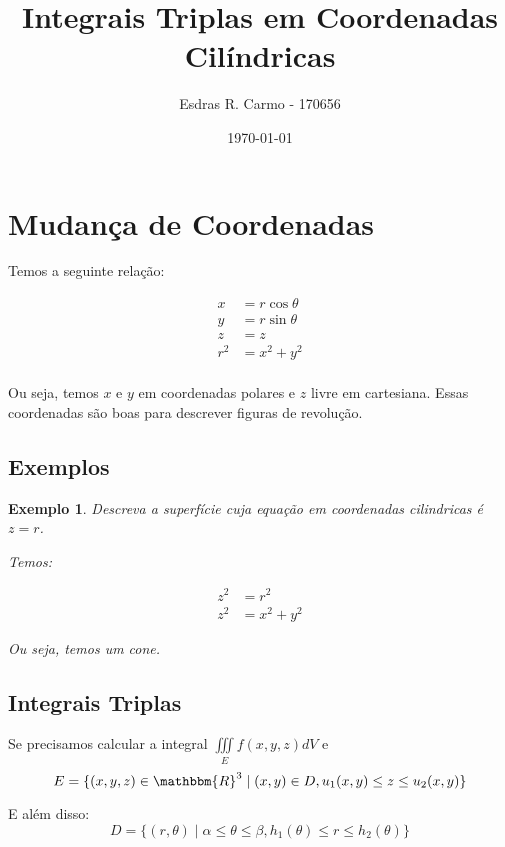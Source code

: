 \documentclass{article}
\author{Esdras R. Carmo - 170656}
\title{Integrais Triplas em Coordenadas Cilíndricas}
\date{\today}
\newcommand{\REAL}{\mathbbm{R}}
\newcommand{\tripleint}[2] {\iiint\limits_{#1} #2}
\newtheorem{example}{Exemplo}[section]
\begin{document}
    \maketitle

    \section{Mudança de Coordenadas}
        Temos a seguinte relação:

        \begin{align*}
            x &= r \cos\theta\\
            y &= r \sin\theta\\
            z &= z\\
            r^2 &= x^2 + y^2\\
        \end{align*}

        Ou seja, temos $x$ e $y$ em coordenadas polares e $z$ livre em cartesiana. Essas coordenadas são
        boas para descrever figuras de revolução.

        \subsection{Exemplos}
            \begin{example}
                Descreva a superfície cuja equação em coordenadas cilindricas é
                $z = r$.

                Temos:

                \begin{align*}
                    z^2 &= r^2\\
                    z^2 &= x^2 + y^2
                \end{align*}

                Ou seja, temos um cone.
            \end{example}

        \subsection{Integrais Triplas}
            Se precisamos calcular a integral $\tripleint{E}{f(x,y,z) dV}$ e 
            \[
                E = \{(x,y,z) \in \REAL^3 \mid (x,y) \in D, u_1(x,y) \leq z \leq u_2(x,y) \}
            \]
            
            E além disso:
            \[
                D = \{(r, \theta) \mid \alpha \leq \theta \leq \beta, h_1(\theta) \leq r \leq h_2(\theta) \}
            \]
\end{document}

